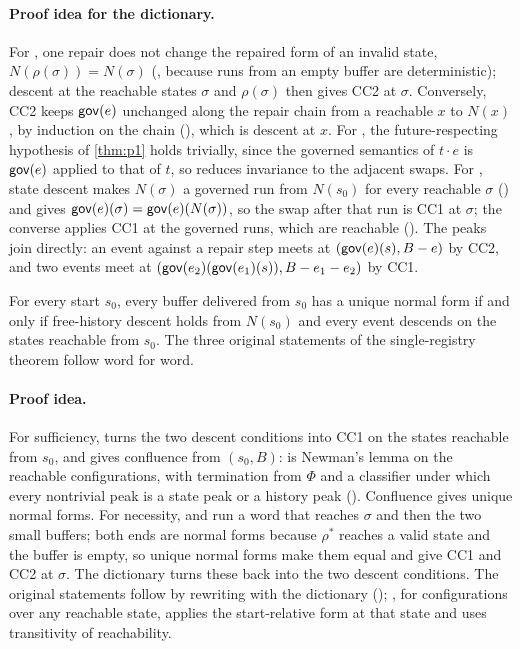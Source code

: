 \paragraph{Proof idea for the dictionary.}
For , one repair does not change the repaired form of an invalid state,
$N(\rho(\sigma)) = N(\sigma)$ (, because runs from an empty buffer are deterministic);
descent at the reachable states $\sigma$ and $\rho(\sigma)$ then gives CC2 at $\sigma$. Conversely, CC2
keeps $\mathsf{gov}(e)$ unchanged along the repair chain from a reachable $x$ to $N(x)$, by induction on the
chain (), which is descent at $x$. For , the future-respecting
hypothesis of \cref{thm:p1} holds trivially, since the governed semantics of $t \cdot e$ is $\mathsf{gov}(e)$
applied to that of $t$, so  reduces invariance to the adjacent swaps. For
, state descent makes $N(\sigma)$ a governed run from $N(s_0)$ for every reachable
$\sigma$ () and gives $\mathsf{gov}(e)(\sigma) = \mathsf{gov}(e)(N(\sigma))$, so the swap after
that run is CC1 at $\sigma$; the converse applies CC1 at the governed runs, which are reachable
(). The peaks join directly: an event against a repair step meets at
$(\mathsf{gov}(e)(s), B - e)$ by CC2, and two events meet at $(\mathsf{gov}(e_2)(\mathsf{gov}(e_1)(s)), B - e_1 - e_2)$ by CC1.

\begin{theorem}\label{thm:derived}
For every start $s_0$, every buffer delivered from $s_0$ has a unique normal form if and only if
free-history descent holds from $N(s_0)$ and every event descends on the states reachable from $s_0$.
The three original statements of the single-registry theorem follow word for word.
\end{theorem}

\paragraph{Proof idea.}
For sufficiency,  turns the two descent conditions into CC1 on the states
reachable from $s_0$, and  gives confluence from $(s_0, B)$:
 is Newman's lemma on the reachable configurations, with termination from
$\Phi$ and a classifier under which every nontrivial peak is a state peak or a history peak
(). Confluence gives unique normal forms. For necessity,  and
 run a word that reaches $\sigma$ and then the two small buffers; both ends are normal
forms because $\rho^{*}$ reaches a valid state and the buffer is empty, so unique normal forms make
them equal and give CC1 and CC2 at $\sigma$. The dictionary turns these back into the two descent
conditions. The original statements follow by rewriting with the dictionary
(); , for configurations over any reachable state, applies
the start-relative form at that state and uses transitivity of reachability.

